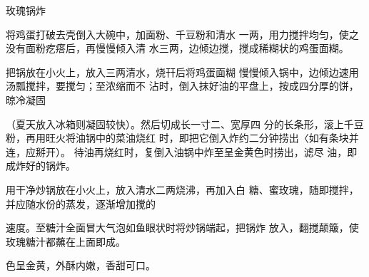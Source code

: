 \begin{recipe}{玫瑰锅炸}

\ingredients



\cooking

\step 将鸡蛋打破去壳倒入大碗中，加面粉、千豆粉和清水 一两，用力搅拌均匀，使之没有面粉疙瘩后，再慢慢倾入清 水三两，边倾边搅，搅成稀糊状的鸡蛋面糊。

\step 把锅放在小火上，放入三两清水，烧幵后将鸡蛋面糊 慢慢倾入锅中，边倾边速用汤瓢搅拌，要搅匀；至浓缩而不 沾时，倒入抹好油的平盘上，按成四分厚的饼，晾冷凝固

（夏天放入冰箱则凝固较快）。然后切成长一寸二、宽厚四 分的长条形，滚上千豆粉，再用旺火将油锅中的菜油烧红 时，即把它倒入炸约二分钟捞出〈如有条块并连，应掰开）。 待油再烧红时，复倒入油锅中炸至呈金黄色时捞出，滤尽 油，即成炸好的锅炸。

\step 用干净炒锅放在小火上，放入清水二两烧沸，再加入白 糖、蜜玫瑰，随即搅拌，并应随水份的蒸发，逐渐增加搅的

速度。至糖汁全面冒大气泡如鱼眼状时将炒锅端起，把锅炸 放入，翻搅颠簸，使玫瑰糖汁都蘸在上面即成。

\notes

色呈金黄，外酥内嫩，香甜可口。

\end{recipe}


